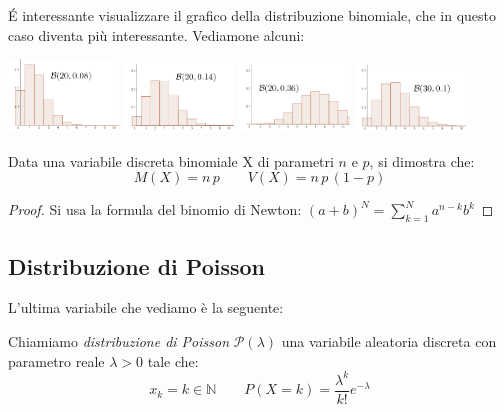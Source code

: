 \'E interessante visualizzare il grafico della distribuzione binomiale, che in questo caso diventa più interessante. Vediamone alcuni:

\begin{center}
  \includegraphics[width=0.22\textwidth]{img/binomiale1.png}
  \includegraphics[width=0.22\textwidth]{img/binomiale2.png}
  \includegraphics[width=0.22\textwidth]{img/binomiale3.png}
  \includegraphics[width=0.22\textwidth]{img/binomiale4.png}
\end{center}

\begin{proprieta} Data una variabile discreta binomiale X di parametri $n$ e $p$, si dimostra che: 
\[\boxed{M(X) = n \,p} \qquad \boxed{V(X) = n \,p\,(1-p)}\]
\end{proprieta}

\begin{proof} Si usa la formula del binomio di Newton: \quad $\displaystyle (a+b)^N = \sum_{k=1}^N a^{n-k} b^k$
\end{proof}



\subsection{Distribuzione di Poisson}
L'ultima variabile che vediamo è la seguente:

\begin{definizione} Chiamiamo \emph{distribuzione di Poisson} $\mathcal{P}(\lambda)$ una variabile aleatoria discreta con parametro reale $\lambda >0$ tale che:
\[ x_k = k \in \mathbb{N} \qquad P(X=k)= \dfrac{\lambda^k}{k!} e^{-\lambda}\]
\end{definizione}

